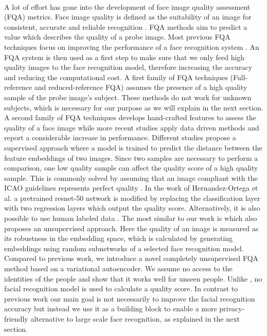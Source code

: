 \documentclass[letterpaper]{article} %
\begin{document}
\\
\newline
A lot of effort has gone into the development of face image quality assessment (FQA) metrics. Face image quality is defined as the suitability of an image for consistent, accurate and reliable recognition \cite{hernandez2020biometric}. FQA methods aim to predict a value which describes the quality of a probe image. Most previous FQA techniques focus on improving the performance of a face recognition system \cite{wong_cvprw_2011, anantharajah2012quality, qi2018boosting, vignesh2015face, best2017automatic, hernandez2020biometric, terhorst2020ser}. An FQA system is then used as a first step to make sure that we only feed high quality images to the face recognition model, therefore increasing the accuracy and reducing the computational cost. A first family of FQA techniques (Full-reference and reduced-reference FQA) assumes the presence of a high quality sample of the probe image's subject. These methods do not work for unknown subjects, which is necessary for our purpose as we will explain in the next section. A second family of FQA techniques develops hand-crafted features to assess the quality of a face image \cite{anantharajah2012quality, REFICAO} while more recent studies apply data driven methods and report a considerable increase in performance. Different studies \cite{qi2018boosting, vignesh2015face} propose a supervised approach where a model is trained to predict the distance between the feature embeddings of two images. Since two samples are necessary to perform a comparison, one low quality sample can affect the quality score of a high quality sample. This is commonly solved by assuming that an image compliant with the ICAO guidelines \cite{REFICAO} represents perfect quality \cite{hernandez2020biometric}. In the work of Hernandez-Ortega et al. a pretrained resnet-50 network \cite{he2016deep} is modified by replacing the classification layer with two regression layers which output the quality score. Alternatively, it is also possible to use human labeled data \cite{best2017automatic}. The most similar to our work is \cite{terhorst2020ser} which also proposes an unsupervised approach. Here the quality of an image is measured as its robustness in the embedding space, which is calculated by generating embeddings using random subnetworks of a selected face recognition model.
\\
\newline
Compared to previous work, we introduce a novel completely unsupervised FQA method based on a variational autoencoder. We assume no access to the identities of the people and show that it works well for unseen people. Unlike \cite{terhorst2020ser}, no facial recognition model is used to calculate a quality score. In contrast to previous work our main goal is not necessarily to improve the facial recognition accuracy but instead we use it as a building block to enable a more privacy-friendly alternative to large scale face recognition, as explained in the next section.
\end{document}
